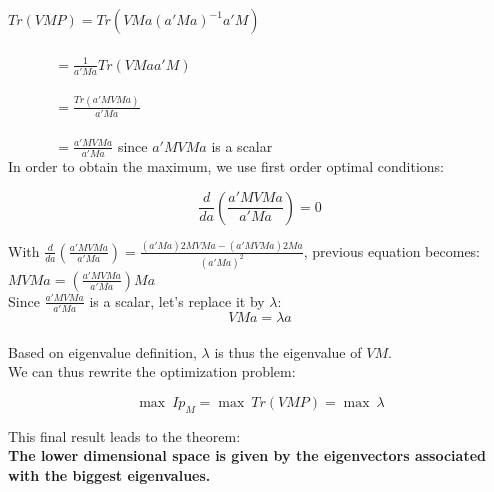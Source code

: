 $Tr(VMP) = Tr(VMa(a'Ma)^{-1}a'M)$ \\ \\
$~~~~~~~~~~~~~~~= \frac{1}{a'Ma}Tr(VMaa'M)$ \\ \\
$~~~~~~~~~~~~~~~= \frac{Tr(a'MVMa)}{a'Ma}$ \\ \\
$~~~~~~~~~~~~~~~= \frac{a'MVMa}{a'Ma}$ since $a'MVMa$ is a scalar \\

In order to obtain the maximum, we use first order optimal conditions:

$$\frac{d}{da}(\frac{a'MVMa}{a'Ma}) = 0$$

With $\frac{d}{da}(\frac{a'MVMa}{a'Ma}) = \frac{(a'Ma)2MVMa-(a'MVMa)2Ma}{(a'Ma)^2}$, previous equation becomes: \\

$MVMa = (\frac{a'MVMa}{a'Ma})Ma$ \\

Since $\frac{a'MVMa}{a'Ma}$ is a scalar, let's replace it by $\lambda$: \\

$$VMa = \lambda a$$ \\

Based on eigenvalue definition, $\lambda$ is thus the eigenvalue of $VM$. \\

We can thus rewrite the optimization problem:

$$\max~Ip_M = \max~Tr(VMP) = \max~\lambda$$

This final result leads to the theorem: \\

\textbf{The lower dimensional space is given by the eigenvectors associated with the biggest eigenvalues.}




\vspace{5mm}